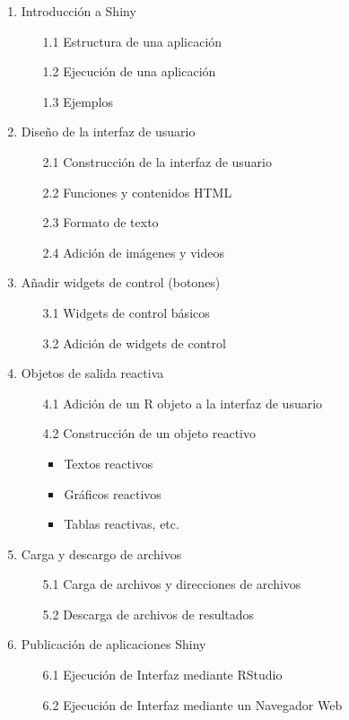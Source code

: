 \documentclass[12pt,a4paper,oneside]{article}\usepackage[]{graphicx}\usepackage[]{color}
\begin{document}
\begin{enumerate}
   \item{Introducción a Shiny}
   \begin{enumerate}
      \item[1.1]{Estructura de una aplicación}
      \item[1.2]{Ejecución de una aplicación}
      \item[1.3]{Ejemplos}
   \end{enumerate}
   \item{Diseño de la interfaz de usuario}
   \begin{enumerate}
      \item[2.1]{Construcción de la interfaz de usuario}
      \item[2.2]{Funciones y contenidos HTML}
      \item[2.3]{Formato de texto}
      \item[2.4]{Adición de imágenes y videos}
   \end{enumerate}
   \item{Añadir widgets de control (botones)}
   \begin{enumerate}
      \item[3.1]{Widgets de control básicos}
      \item[3.2]{Adición de widgets de control}
   \end{enumerate}
   \item{Objetos de salida reactiva}
   \begin{enumerate}
      \item[4.1]{Adición de un R objeto a la interfaz de usuario}
      \item[4.2]{Construcción de un objeto reactivo}
      \begin{itemize}
         \item Textos reactivos
         \item Gráficos reactivos
         \item Tablas reactivas, etc.
      \end{itemize}
   \end{enumerate}
   \item{Carga y descargo de archivos}
   \begin{enumerate}
      \item[5.1]{Carga de archivos y direcciones de archivos}
      \item[5.2]{Descarga de archivos de resultados}
   \end{enumerate}
   \item{Publicación de aplicaciones Shiny}
   \begin{enumerate}
      \item[6.1]{Ejecución de Interfaz mediante RStudio}
      \item[6.2]{Ejecución de Interfaz mediante un Navegador Web}
   \end{enumerate}
\end{enumerate}
\end{document}
